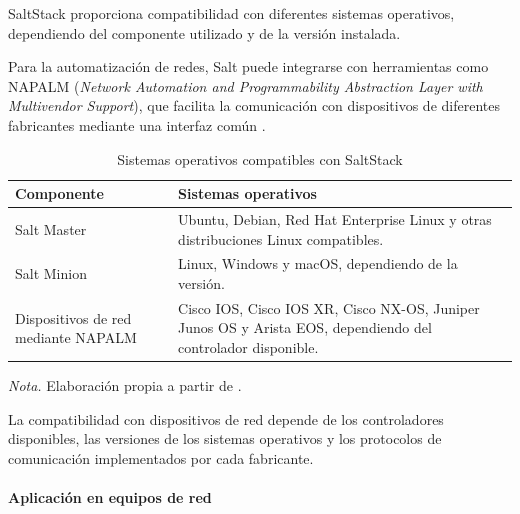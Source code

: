 \documentclass[12pt,a4paper]{article}
\begin{document}
SaltStack proporciona compatibilidad con diferentes sistemas
operativos, dependiendo del componente utilizado y de la
versión instalada.

Para la automatización de redes, Salt puede integrarse con
herramientas como NAPALM (\textit{Network Automation and
Programmability Abstraction Layer with Multivendor Support}),
que facilita la comunicación con dispositivos de diferentes
fabricantes mediante una interfaz común
\parencite{salt_napalm_proxy}.

\begin{table}[H]
    \centering
    \caption{Sistemas operativos compatibles con SaltStack}
    \label{tab:so_salt}

    \begin{tabularx}{\textwidth}{p{}X}
        \toprule

        \textbf{Componente} &
        \textbf{Sistemas operativos} \\

        \midrule

        Salt Master &
        Ubuntu, Debian, Red Hat Enterprise Linux y otras
        distribuciones Linux compatibles. \\

        Salt Minion &
        Linux, Windows y macOS, dependiendo de la versión. \\

        Dispositivos de red mediante NAPALM &
        Cisco IOS, Cisco IOS XR, Cisco NX-OS,
        Juniper Junos OS y Arista EOS, dependiendo del
        controlador disponible. \\

        \bottomrule
    \end{tabularx}

    \vspace{0.2cm}

    {\footnotesize
    \textit{Nota.} Elaboración propia a partir de
    \parencite{salt_user_guide,salt_napalm_proxy,napalm_support}.}
\end{table}

La compatibilidad con dispositivos de red depende de los
controladores disponibles, las versiones de los sistemas
operativos y los protocolos de comunicación implementados
por cada fabricante.


\paragraph{Aplicación en equipos de red}
\end{document}
